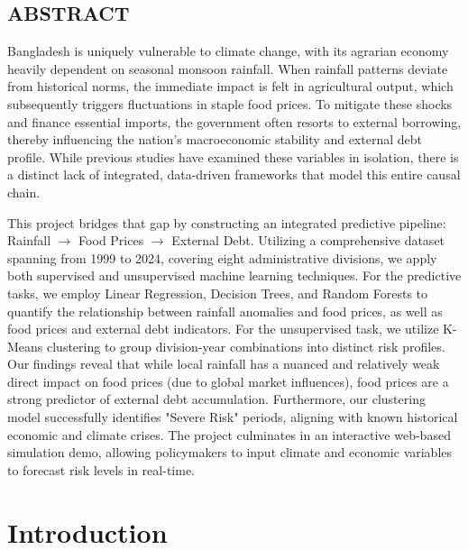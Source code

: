 \documentclass[12pt,a4paper]{article}
\begin{document}
\begin{mdframed}[backgroundcolor=gray!8,linecolor=titleblue,linewidth=1.5pt,
                 innertopmargin=10pt,innerbottommargin=10pt,
                 innerleftmargin=14pt,innerrightmargin=14pt]
\section*{\centering ABSTRACT}
Bangladesh is uniquely vulnerable to climate change, with its agrarian economy heavily dependent on seasonal monsoon rainfall. When rainfall patterns deviate from historical norms, the immediate impact is felt in agricultural output, which subsequently triggers fluctuations in staple food prices. To mitigate these shocks and finance essential imports, the government often resorts to external borrowing, thereby influencing the nation's macroeconomic stability and external debt profile. While previous studies have examined these variables in isolation, there is a distinct lack of integrated, data-driven frameworks that model this entire causal chain.

This project bridges that gap by constructing an integrated predictive pipeline: Rainfall $\rightarrow$ Food Prices $\rightarrow$ External Debt. Utilizing a comprehensive dataset spanning from 1999 to 2024, covering eight administrative divisions, we apply both supervised and unsupervised machine learning techniques. For the predictive tasks, we employ Linear Regression, Decision Trees, and Random Forests to quantify the relationship between rainfall anomalies and food prices, as well as food prices and external debt indicators. For the unsupervised task, we utilize K-Means clustering to group division-year combinations into distinct risk profiles. Our findings reveal that while local rainfall has a nuanced and relatively weak direct impact on food prices (due to global market influences), food prices are a strong predictor of external debt accumulation. Furthermore, our clustering model successfully identifies "Severe Risk" periods, aligning with known historical economic and climate crises. The project culminates in an interactive web-based simulation demo, allowing policymakers to input climate and economic variables to forecast risk levels in real-time.
\end{mdframed}
\newpage

\tableofcontents
\newpage
\listoffigures
\newpage
\listoftables
\newpage

\clearpage
\section{Introduction}
\end{document}
